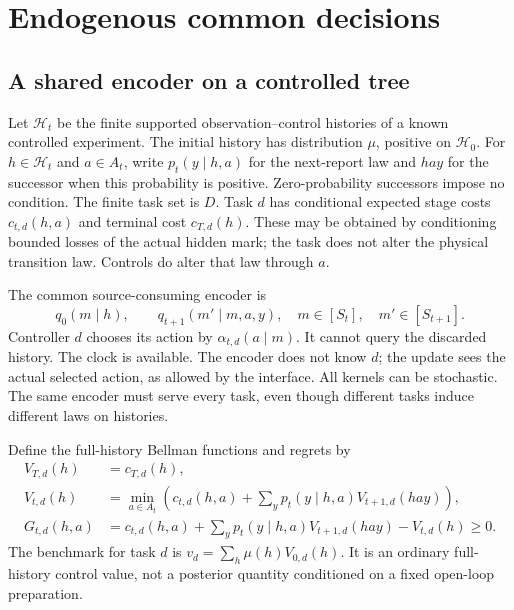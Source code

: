 \section{Endogenous common decisions}\label{sec:v13-controlled}
\subsection{A shared encoder on a controlled tree}
Let $\mathcal H_t$ be the finite supported observation--control histories
of a known controlled experiment. The initial history has distribution
$\mu$, positive on $\mathcal H_0$. For $h\in\mathcal H_t$ and $a\in A_t$,
write $p_t(y\mid h,a)$ for the next-report law and $hay$ for the successor
when this probability is positive. Zero-probability successors impose no
condition. The finite task set is $D$. Task $d$ has conditional expected
stage costs $c_{t,d}(h,a)$ and terminal cost $c_{T,d}(h)$. These may be
obtained by conditioning bounded losses of the actual hidden mark;
the task does not alter the physical transition law. Controls do alter
that law through $a$.

The common source-consuming encoder is
\[
 q_0(m\mid h),\qquad
 q_{t+1}(m'\mid m,a,y),\quad m\in[S_t],\quad m'\in[S_{t+1}].
\]
Controller $d$ chooses its action by $\alpha_{t,d}(a\mid m)$. It cannot
query the discarded history. The clock is available. The encoder does
not know $d$; the update sees the actual selected action, as allowed by
the interface. All kernels can be stochastic. The same encoder must
serve every task, even though different tasks induce different laws
on histories.

Define the full-history Bellman functions and regrets by
\begin{align}
 V_{T,d}(h)&=c_{T,d}(h),\nonumber\\
 V_{t,d}(h)&=\min_{a\in A_t}
   \left(c_{t,d}(h,a)+\sum_y p_t(y\mid h,a)V_{t+1,d}(hay)\right),
                                      \label{eq:v13-bellman}\\
 G_{t,d}(h,a)&=c_{t,d}(h,a)+\sum_y p_t(y\mid h,a)V_{t+1,d}(hay)
                                  -V_{t,d}(h)\ge0.\nonumber
\end{align}
The benchmark for task $d$ is $v_d=\sum_h\mu(h)V_{0,d}(h)$.
It is an ordinary full-history control value, not a posterior quantity
conditioned on a fixed open-loop preparation.

